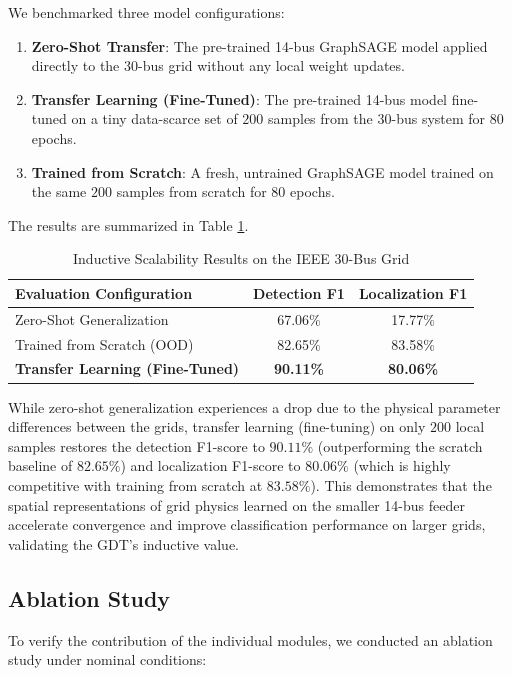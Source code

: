 \documentclass[conference]{IEEEtran}
\begin{document}
We benchmarked three model configurations:
\begin{enumerate}
    \item \textbf{Zero-Shot Transfer}: The pre-trained 14-bus GraphSAGE model applied directly to the 30-bus grid without any local weight updates.
    \item \textbf{Transfer Learning (Fine-Tuned)}: The pre-trained 14-bus model fine-tuned on a tiny data-scarce set of $200$ samples from the 30-bus system for $80$ epochs.
    \item \textbf{Trained from Scratch}: A fresh, untrained GraphSAGE model trained on the same $200$ samples from scratch for $80$ epochs.
\end{enumerate}

The results are summarized in Table \ref{tab:scalability}.

\begin{table}[htbp]
  \caption{Inductive Scalability Results on the IEEE 30-Bus Grid}
  \label{tab:scalability}
  \centering
  \begin{tabular}{lcc}
    \hline
    \textbf{Evaluation Configuration} & \textbf{Detection F1} & \textbf{Localization F1} \\
    \hline
    Zero-Shot Generalization & 67.06\% & 17.77\% \\
    Trained from Scratch (OOD) & 82.65\% & 83.58\% \\
    \textbf{Transfer Learning (Fine-Tuned)} & \textbf{90.11\%} & \textbf{80.06\%} \\
    \hline
  \end{tabular}
\end{table}

While zero-shot generalization experiences a drop due to the physical parameter differences between the grids, transfer learning (fine-tuning) on only $200$ local samples restores the detection F1-score to $90.11\%$ (outperforming the scratch baseline of $82.65\%$) and localization F1-score to $80.06\%$ (which is highly competitive with training from scratch at $83.58\%$). This demonstrates that the spatial representations of grid physics learned on the smaller 14-bus feeder accelerate convergence and improve classification performance on larger grids, validating the GDT's inductive value.

\subsection{Ablation Study}
To verify the contribution of the individual modules, we conducted an ablation study under nominal conditions:
\end{document}
